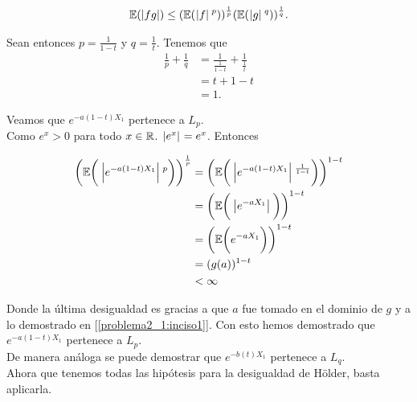     \begin{align}
                \mathbb{E}(| fg |) \leq (\mathbb{E}(\hspace{.25mm}\left|f\right|\hspace{.25mm}^p))^{\frac{1}{p}} (\mathbb{E}(\hspace{.25mm}\left|g\right|\hspace{.25mm}^q))^\frac{1}{q}.
    \end{align}
    
    Sean entonces $p = \frac{1}{1-t}$ y $q = \frac{1}{t}$. Tenemos que\\
    
    \begin{align}
        \frac{1}{p} + \frac{1}{q}   &= \frac{1}{\frac{1}{1-t}} + \frac{1}{\frac{1}{t}}  \\
                                    &= t + 1 - t                                        \\ 
                                    &= 1.
    \end{align}
    
    Veamos que $e^{-a(1-t) X_1}$ pertenece a $L_p$. \\
    
    Como $e^x > 0$ para todo $x \in \mathbb{R}$. $\hspace{.25mm}\left|e^x\right|\hspace{.25mm} = e^x$. Entonces
    
    \begin{align}
         \bigg(\mathbb{E}\bigg(\hspace{.25mm}\left|e^{-a(1-t) X_1}\right|\hspace{.25mm}^p\bigg)\bigg)^{\frac{1}{p}} 
                &=  \bigg(\mathbb{E}\bigg(\hspace{.25mm}\left|e^{-a(1-t) X_1}\right|\hspace{.25mm}^{\frac{1}{1-t}}\bigg)\bigg)^{{1-t}} \\
                &=  \bigg(\mathbb{E}\bigg(\hspace{.25mm}\left|e^{-aX_1}\right|\hspace{.25mm}\bigg)\bigg)^{{1-t}}                       \\
                &=  \bigg(\mathbb{E}\bigg(e^{-aX_1}\bigg)\bigg)^{{1-t}}                             \\
                &=  ( g(a))^{{1-t}}                                                         \\
                &<   \infty
    \end{align}
    
    Donde la última desigualdad es gracias a que $a$ fue tomado en el dominio de $g$ y a lo demostrado en 
    [\ref{problema2_1:inciso1}]. Con esto hemos demostrado que $e^{-a(1-t) X_1}$ pertenece a $L_p$.\\
    
    De manera análoga se puede demostrar que $e^{-b(t) X_1}$ pertenece a $L_q$.\\
    
    Ahora que tenemos todas las hipótesis para la desigualdad de Hölder, basta aplicarla.\\
        
